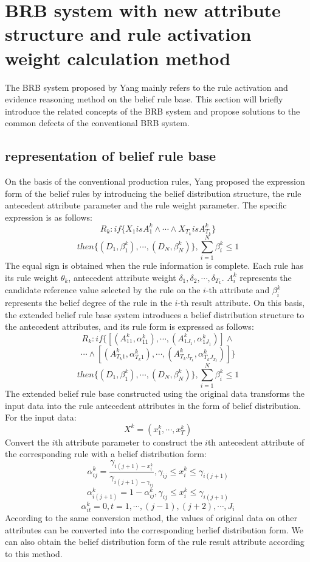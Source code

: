 \documentclass{ieeeaccess}
\begin{document}
\section{BRB system with new attribute structure and rule activation weight calculation method}
The BRB system proposed by Yang mainly refers to the rule activation and evidence reasoning method on the belief rule base. This section will briefly introduce
the related concepts of the BRB system and propose solutions to the common defects of the conventional BRB system.
\subsection{representation of belief rule base}
On the basis of the conventional production rules, Yang\cite{a1} proposed the expression form of the belief rules by introducing the belief distribution structure,
the rule antecedent attribute parameter and the rule weight parameter. The specific expression is as follows:
$$R_k:if\{X_1isA_1^k \wedge \cdots \wedge X_{T_k}isA_{T_k}^k\}$$
$$then\{(D_1,\beta_1^k),\cdots,(D_N,\beta_N^k)\},\sum_{i=1}^N\beta_i^k\leq1$$
The equal sign is obtained when the rule information is complete. Each rule has its rule weight $\theta_k$, antecedent attribute weight $\delta_{1},\delta_{2},\cdots,\delta_{T_k}$.
$A_i^k$ represents the candidate reference value selected by the rule on the $i$-th attribute and $\beta_i^k$ represents the belief degree of the rule in the $i$-th result attribute.
On this basis, the extended belief rule base system introduces a belief distribution structure to the antecedent attributes, and its rule form is expressed as follows:
$$R_k:if\{[(A_{11}^k,\alpha_{11}^k),\cdots,(A_{1J_1}^k,\alpha_{1J_1}^k)] \wedge $$
$$\cdots \wedge [(A_{T_k1}^k,\alpha_{T_k1}^k), \cdots,(A_{T_kJ_{T_k}}^k,\alpha_{T_kJ_{T_k}}^k)]\}$$
$$then\{(D_1,\beta_1^k),\cdots,(D_N,\beta_N^k)\},\sum_{i=1}^N\beta_i^k\leq1$$
The extended belief rule base constructed using the original data transforms the input data into the rule antecedent attributes in the form of belief distribution. For the input data:
$$X^k=(x_1^k,\cdots,x_T^k)$$
Convert the $i$th attribute parameter to construct the $i$th antecedent attribute of the corresponding rule with a belief distribution form:
$$\alpha_{ij}^k=\frac{\gamma_{i(j+1)-x_i^k}}{\gamma_{i(j+1)-\gamma_{ij}}},\gamma_{ij}\leq x_i^k\leq \gamma_{i(j+1)}$$
$$\alpha_{i(j+1)}^k=1-\alpha_{ij}^k,\gamma_{ij}\leq x_i^k\leq \gamma_{i(j+1)}$$
$$\alpha_{it}^k=0,t=1,\cdots,(j-1),(j+2),\cdots,J_i$$
According to the same conversion method, the values of original data on other attributes can be converted into the corresponding berlief distribution form.
We can also obtain the belief distribution form of the rule result attribute according to this method.
\end{document}
